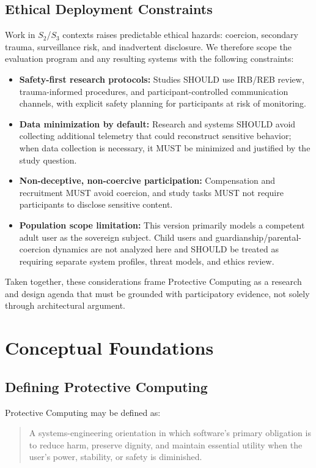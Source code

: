\documentclass[12pt]{article}
\begin{document}
\subsection{Ethical Deployment Constraints}
Work in $S_2$/$S_3$ contexts raises predictable ethical hazards: coercion, secondary trauma, surveillance risk, and inadvertent disclosure. We therefore scope the evaluation program and any resulting systems with the following constraints:
\begin{itemize}
\item \textbf{Safety-first research protocols:} Studies SHOULD use IRB/REB review, trauma-informed procedures, and participant-controlled communication channels, with explicit safety planning for participants at risk of monitoring.
\item \textbf{Data minimization by default:} Research and systems SHOULD avoid collecting additional telemetry that could reconstruct sensitive behavior; when data collection is necessary, it MUST be minimized and justified by the study question.
\item \textbf{Non-deceptive, non-coercive participation:} Compensation and recruitment MUST avoid coercion, and study tasks MUST not require participants to disclose sensitive content.
\item \textbf{Population scope limitation:} This version primarily models a competent adult user as the sovereign subject. Child users and guardianship/parental-coercion dynamics are not analyzed here and SHOULD be treated as requiring separate system profiles, threat models, and ethics review.
\end{itemize}

Taken together, these considerations frame Protective Computing as a research and design agenda that must be grounded with participatory evidence, not solely through architectural argument.

\section{Conceptual Foundations}

\subsection{Defining Protective Computing}
Protective Computing may be defined as:

\begin{quote}
A systems-engineering orientation in which software's primary obligation is to reduce harm, preserve dignity, and maintain essential utility when the user's power, stability, or safety is diminished.
\end{quote}
\end{document}
